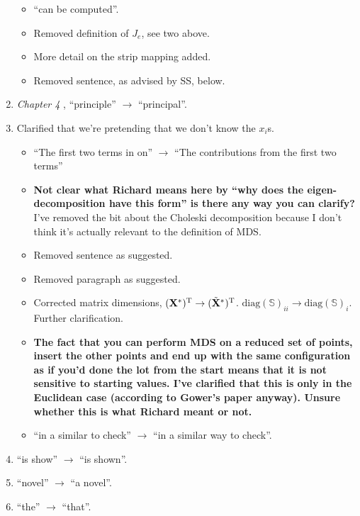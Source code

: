 \begin{enumerate}
\begin{itemize}
	\item {} ``can be computed''.
	\item {} Removed definition of $J_e$, see two above.
	\item {} More detail on the strip mapping added.
	\item {} Removed sentence, as advised by SS, below.%
\end{itemize}
\item \textit{Chapter 4} ,  ``principle'' $\rightarrow$ ``principal''.
\item {} Clarified that we're pretending that we don't know the $x_i$s.
\begin{itemize}
	\item {}``The first two terms in on'' $\rightarrow$ ``The contributions from the first two terms'' 
	\item {} \textbf{Not clear what Richard means here by ``why does the eigen-decomposition have this form'' is there any way you can clarify?} I've removed the bit about the Choleski decomposition because I don't think it's actually relevant to the definition of MDS.
	\item {} Removed sentence as suggested.
	\item {} Removed paragraph as suggested.
	\item {} Corrected matrix dimensions, $(\mathbf{X}^*)^{\text{T}} \rightarrow (\tilde{\mathbf{X}}^*)^{\text{T}}$.  $\text{diag}(\mathbb{S})_{ii} \rightarrow \text{diag}(\mathbb{S})_i$. Further clarification.
	\item {} \textbf{The fact that you can perform MDS on a reduced set of points, insert the other points and end up with the same configuration as if you'd done the lot from the start means that it is not sensitive to starting values. I've clarified that this is only in the Euclidean case (according to Gower's paper anyway). Unsure whether this is what Richard meant or not.}
	\item {} ``in a similar to check'' $\rightarrow$ ``in a similar way to check''.
\end{itemize}
\item {} ``is show'' $\rightarrow$ ``is shown''.
\item {} ``novel'' $\rightarrow$ ``a novel''.
\item {}  ``the'' $\rightarrow$ ``that''.

\end{enumerate}
